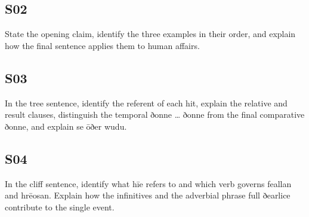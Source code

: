 \par\begin{minipage}{\linewidth}\raggedright
\subsection*{S02}

State the opening claim, identify the three examples in their order, and explain how the final sentence applies them to human affairs.

\end{minipage}\par\addvspace{4pt}

\par\begin{minipage}{\linewidth}\raggedright
\subsection*{S03}

In the tree sentence, identify the referent of each hit, explain the relative and result clauses, distinguish the temporal ðonne … ðonne from the final comparative ðonne, and explain se ōðer wudu.

\end{minipage}\par\addvspace{4pt}

\par\begin{minipage}{\linewidth}\raggedright
\subsection*{S04}

In the cliff sentence, identify what hīe refers to and which verb governs feallan and hrēosan. Explain how the infinitives and the adverbial phrase full ðearlice contribute to the single event.

\end{minipage}\par\addvspace{4pt}

